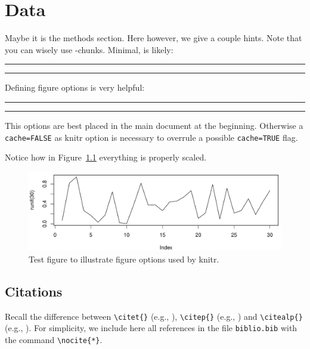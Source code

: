 

\chapter{Data} 
Maybe it is the methods section. Here however, we give a couple hints.
Note that you can wisely use -chunks. Minimal, is likely: 

\bigskip

\hrule

\hrule

\bigskip

Defining figure options is very helpful:

 
\bigskip


\hrule

\hrule

\bigskip 

This options are best placed in the main document at the beginning. Otherwise a \verb+cache=FALSE+ as knitr option is necessary to overrule a possible  \verb+cache=TRUE+ flag. 

\bigskip 

Notice how in Figure~\ref{f02:1} everything is properly scaled.   

\begin{figure}
\begin{knitrout}
\color{fgcolor}

{\centering \includegraphics[width=\textwidth-3cm]{figure/ch02_figunnamed-chunk-3-1} 

}


\end{knitrout}
  \caption{Test figure to illustrate figure options used by knitr.}
  \label{f02:1}
\end{figure}


\section{Citations}

Recall the difference between \verb+\citet{}+ (e.g., \citet{Chu:Geor:99}), \verb+\citep{}+ (e.g., \citep{Chu:Geor:99}) and \verb+\citealp{}+ (e.g., \citealp{Chu:Geor:99}).
For simplicity, we include here all references in the file \verb+biblio.bib+ with the command \verb+\nocite{*}+.\nocite{*}


